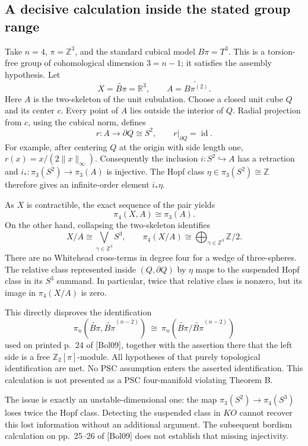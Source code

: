 \documentclass[10pt]{article}
\begin{document}
\subsection*{A decisive calculation inside the stated group range}
Take \(n=4\), \(\pi=\mathbb Z^3\), and the standard cubical model \(B\pi=T^3\). This is a torsion-free group of cohomological dimension \(3=n-1\); it satisfies the assembly hypothesis. Let \[X=\widetilde{B\pi}=\mathbb R^3,\qquad A=\widetilde{B\pi^{(2)}}.\] Here \(A\) is the two-skeleton of the unit cubulation. Choose a closed unit cube \(Q\) and its center \(c\). Every point of \(A\) lies outside the interior of \(Q\). Radial projection from \(c\), using the cubical norm, defines \[r:A\longrightarrow\partial Q\cong S^2,\qquad
 r|_{\partial Q}=\operatorname{id}.\] For example, after centering \(Q\) at the origin with side length one, \(r(x)=x/(2\|x\|_\infty)\). Consequently the inclusion \(i:S^2\hookrightarrow A\) has a retraction and \(i_*:\pi_3(S^2)\to\pi_3(A)\) is injective. The Hopf class \(\eta\in\pi_3(S^2)\cong\mathbb Z\) therefore gives an infinite-order element \(i_*\eta\).\par
As \(X\) is contractible, the exact sequence of the pair yields \[\pi_4(X,A)\cong\pi_3(A).\] On the other hand, collapsing the two-skeleton identifies \[X/A\cong\bigvee_{\gamma\in\mathbb Z^3}S^3,\qquad
 \pi_4(X/A)\cong\bigoplus_{\gamma\in\mathbb Z^3}\mathbb Z/2.\] There are no Whitehead cross-terms in degree four for a wedge of three-spheres. The relative class represented inside \((Q,\partial Q)\) by \(\eta\) maps to the suspended Hopf class in its \(S^3\) summand. In particular, twice that relative class is nonzero, but its image in \(\pi_4(X/A)\) is zero.\par
This directly disproves the identification \[\pi_n(\widetilde{B\pi},\widetilde{B\pi}^{(n-2)})
 \ \cong\
 \pi_n(\widetilde{B\pi}/\widetilde{B\pi}^{(n-2)})
 \tag{*}\] used on printed p. 24 of [Bol09], together with the assertion there that the left side is a free \(\mathbb Z_2[\pi]\)-module. All hypotheses of that purely topological identification are met. No PSC assumption enters the asserted identification. This calculation is not presented as a PSC four-manifold violating Theorem B.\par
The issue is exactly an unstable-dimensional one: the map \(\pi_3(S^2)\to\pi_4(S^3)\) loses twice the Hopf class. Detecting the suspended class in \(KO\) cannot recover this lost information without an additional argument. The subsequent bordism calculation on pp. 25–26 of [Bol09] does not establish that missing injectivity.\par
\end{document}
